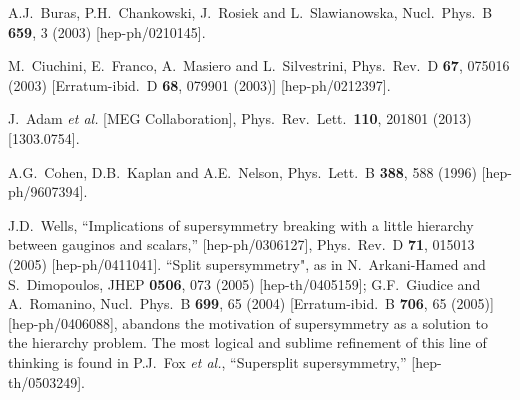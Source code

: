 \documentclass[11pt]{article}
\begin{document}
\begin{thebibliography}{999}
A.J.~Buras, P.H.~Chankowski, J.~Rosiek and L.~Slawianowska,
  Nucl.\ Phys.\ B {\bf 659}, 3 (2003)
  [hep-ph/0210145].

M.~Ciuchini, E.~Franco, A.~Masiero and L.~Silvestrini,
  Phys.\ Rev.\ D {\bf 67}, 075016 (2003)
  [Erratum-ibid.\ D {\bf 68}, 079901 (2003)]
  [hep-ph/0212397].

J.~Adam {\it et al.} [MEG Collaboration],
  Phys.\ Rev.\ Lett.\  {\bf 110}, 201801 (2013)
  [1303.0754].
%

A.G.~Cohen, D.B.~Kaplan and A.E.~Nelson,
  Phys.\ Lett.\ B {\bf 388}, 588 (1996)
  [hep-ph/9607394].

J.D.~Wells,
  ``Implications of supersymmetry breaking with a little hierarchy between
  gauginos and scalars,''
  [hep-ph/0306127],
  Phys.\ Rev.\ D {\bf 71}, 015013 (2005)
  [hep-ph/0411041].
``Split supersymmetry", as in 
N.~Arkani-Hamed and S.~Dimopoulos,
  JHEP {\bf 0506}, 073 (2005)
  [hep-th/0405159];
G.F.~Giudice and A.~Romanino,
  Nucl.\ Phys.\ B {\bf 699}, 65 (2004)
  [Erratum-ibid.\ B {\bf 706}, 65 (2005)]
  [hep-ph/0406088],
abandons the motivation of supersymmetry as
a solution to the hierarchy problem. The most logical and
sublime refinement of this line of thinking is found in
P.J.~Fox {\it et al.},
  ``Supersplit supersymmetry,''
  [hep-th/0503249].


\end{thebibliography}
\end{document}
